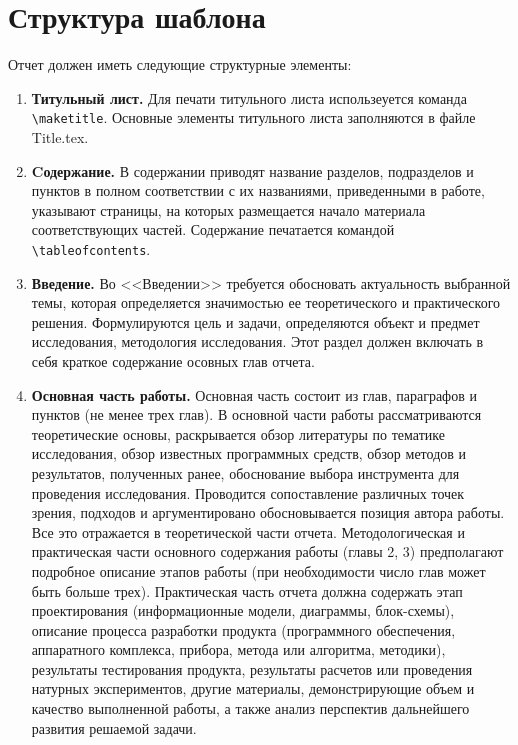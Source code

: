 \chapter{Структура шаблона}

Отчет должен иметь следующие структурные элементы:

\begin{enumerate}

\item \textbf{Титульный лист.} Для печати титульного листа использеуется
команда \verb|\maketitle|.  Основные элементы титульного листа заполняются
в файле Title.tex.

\item \textbf{Cодержание.} В содержании приводят название разделов,
подразделов и пунктов в полном соответствии с их названиями, приведенными
в работе, указывают страницы, на которых размещается 
начало материала соответствующих частей. Содержание печатается
командой \verb|\tableofcontents|.

\item \textbf{Введение.} Во <<Введении>> требуется обосновать актуальность
выбранной темы, которая определяется значимостью ее теоретического и
практического решения. Формулируются цель и задачи, определяются объект
и предмет исследования, методология исследования. Этот раздел должен
включать в себя краткое содержание осовных глав отчета.

\item \textbf{Основная часть работы.} Основная часть состоит из глав,
параграфов и пунктов (не менее трех глав). В основной части работы
рассматриваются теоретические основы, раскрывается обзор литературы
по тематике исследования, обзор известных программных средств, обзор методов и
результатов, полученных ранее, обоснование выбора инструмента для проведения
исследования. Проводится сопоставление различных точек зрения, подходов и
аргументировано обосновывается позиция автора работы. Все это отражается
в теоретической части отчета. Методологическая и практическая части основного
содержания работы (главы 2, 3) предполагают подробное описание этапов работы
(при необходимости число глав может быть больше трех). Практическая часть
отчета должна содержать этап проектирования (информационные модели, диаграммы,
блок-схемы), описание процесса разработки продукта (программного обеспечения,
аппаратного комплекса, прибора, метода или алгоритма, методики), результаты
тестирования продукта,  результаты расчетов или проведения натурных
экспериментов, другие материалы, демонстрирующие объем и качество
выполненной работы, а также анализ перспектив дальнейшего развития
решаемой задачи.


\end{enumerate}
